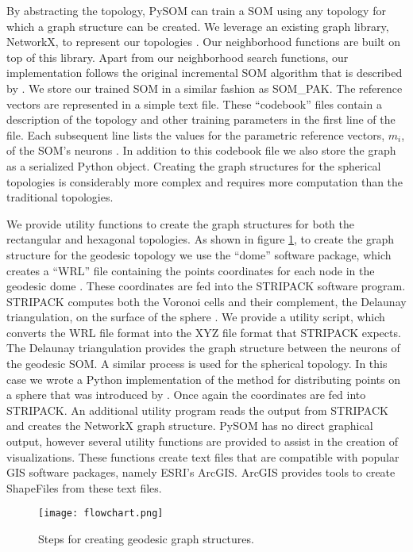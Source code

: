By abstracting the topology, PySOM can train a SOM using any topology for
which a graph structure can be created. We leverage an existing graph library,
NetworkX, to represent our topologies \citep{networkx}.  Our neighborhood
functions are built on top of this library.  Apart from our neighborhood
search functions, our implementation follows the original incremental SOM
algorithm that is described by \cite{Kohonen2000}.  We store our trained SOM
in a similar fashion as SOM\_PAK.  The reference vectors are represented in a
simple text file.  These ``codebook'' files contain a description of the
topology and other training parameters in the first line of the file.  Each
subsequent line lists the values for the parametric reference vectors, $m_i$,
of the SOM's neurons \citep{kohonen1996}. In addition to this codebook file we
also store the graph as a serialized Python object.  Creating the graph
structures for the spherical topologies is considerably more complex and
requires more computation than the traditional topologies.

We provide utility functions to create the graph structures for both the
rectangular and hexagonal topologies.  As shown in figure \ref{flowchart}, to create the graph structure for the
geodesic topology we use the ``dome'' software package, which creates a
``WRL'' file containing the points coordinates for each node in the geodesic
dome \citep{dome}.  These coordinates are fed into the STRIPACK software
program.  STRIPACK computes both the Voronoi cells and their complement, the
Delaunay triangulation, on the surface of the sphere \citep{Ranka97}.  We
provide a utility script, which converts the WRL file format into
the XYZ file format that STRIPACK expects.  The Delaunay triangulation provides the graph
structure between the neurons of the geodesic SOM.  A similar process is used
for the spherical topology. In this case we wrote a Python implementation of
the method for distributing points on a sphere that was introduced by
\cite{Rakhmanov94}.  Once again the coordinates are fed into STRIPACK.
An additional utility program reads the output from STRIPACK and
creates the NetworkX graph structure.  PySOM has no direct graphical
output, however several utility functions are provided to assist in the
creation of visualizations.  These functions create text files that are compatible with
popular GIS software packages, namely ESRI's ArcGIS.  ArcGIS provides tools to
create ShapeFiles from these text files.

\begin{figure}[htb]
\centering
\texttt{[image: flowchart.png]}
\caption{Steps for creating geodesic graph structures.}
\label{flowchart}
\end{figure}

